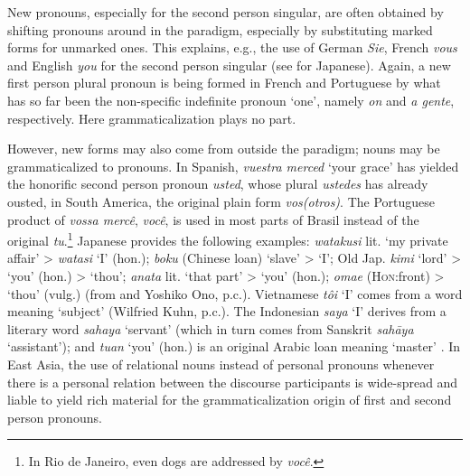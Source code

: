 New pronouns, especially for the second person singular, are often obtained by shifting pronouns around in the paradigm, especially by substituting marked forms for unmarked ones. This explains, e.g., the use of German \textit{Sie}, French \textit{vous} and English \textit{you} for the second person singular (see \citealt[112]{Syromjatnikov1980} for Japanese). Again, a new first person plural pronoun is being formed in French and Portuguese by what has so far been the non-specific indefinite pronoun ‘one’, namely \textit{on} and \textit{a gente}, respectively. Here grammaticalization plays no part.

However, new forms may also come from outside the paradigm; nouns may be grammaticalized to pronouns. In Spanish, \textit{vuestra merced} ‘your grace’ has yielded the honorific second person pronoun \textit{usted}, whose plural \textit{ustedes} has already ousted, in South America, the original plain form \textit{vos(otros)}. The Portuguese product of \textit{vossa mercê}, \textit{você}, is used in most parts of Brasil instead of the original \textit{tu}.\footnote{In Rio de Janeiro, even dogs are addressed by \textit{você}.} Japanese provides the following examples: \textit{watakusi} lit. ‘my private affair’ {\textgreater} \textit{watasi} ‘I’ (hon.); \textit{boku} (Chinese loan) ‘slave’ {\textgreater} ‘I’; Old Jap. \textit{kimi} ‘lord’ {\textgreater} ‘you’ (hon.) {\textgreater} ‘thou’; \textit{anata} lit. ‘that part’ {\textgreater} ‘you’ (hon.); \textit{omae} (\textsc{Hon}:front) {\textgreater} ‘thou’ (vulg.) (from \citealt{Syromjatnikov1980} and Yoshiko Ono, p.c.). Vietnamese \textit{tôi} ‘I’ comes from a word meaning ‘subject’ (Wilfried Kuhn, p.c.). The Indonesian \textit{saya} ‘I’ derives from a literary word \textit{sahaya} ‘servant’ (which in turn comes from Sanskrit \textit{sah\=aya} ‘assistant’); and \textit{tuan} ‘you’ (hon.) is an original Arabic loan meaning ‘master’ \citep[152]{Gabelentz1891}. In East Asia, the use of relational nouns instead of personal pronouns whenever there is a personal relation between the discourse participants is wide-spread and liable to yield rich material for the grammaticalization origin of first and second person pronouns.


